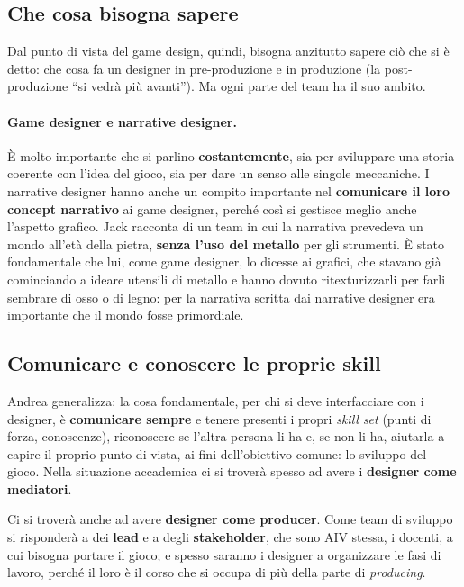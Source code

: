 \subsection{Che cosa bisogna sapere}

Dal punto di vista del game design, quindi, bisogna anzitutto sapere ciò che
si è detto: che cosa fa un designer in pre-produzione e in produzione (la
post-produzione ``si vedrà più avanti''). Ma ogni parte del team ha il suo
ambito.

\paragraph{Game designer e narrative designer.} È molto importante che si
parlino \textbf{costantemente}, sia per sviluppare una storia coerente con
l'idea del gioco, sia per dare un senso alle singole meccaniche. I narrative
designer hanno anche un compito importante nel \textbf{comunicare il loro
concept narrativo} ai game designer, perché così si gestisce meglio anche
l'aspetto grafico. Jack racconta di un team in cui la narrativa prevedeva un
mondo all'età della pietra, \textbf{senza l'uso del metallo} per gli
strumenti. È stato fondamentale che lui, come game designer, lo dicesse ai
grafici, che stavano già cominciando a ideare utensili di metallo e hanno
dovuto ritexturizzarli per farli sembrare di osso o di legno: per la
narrativa scritta dai narrative designer era importante che il mondo fosse
primordiale.

\subsection{Comunicare e conoscere le proprie skill}

Andrea generalizza: la cosa fondamentale, per chi si deve interfacciare con
i designer, è \textbf{comunicare sempre} e tenere presenti i propri
\emph{skill set} (punti di forza, conoscenze), riconoscere se l'altra persona
li ha e, se non li ha, aiutarla a capire il proprio punto di vista, ai fini
dell'obiettivo comune: lo sviluppo del gioco. Nella situazione accademica ci
si troverà spesso ad avere i \textbf{designer come mediatori}.

Ci si troverà anche ad avere \textbf{designer come producer}. Come team di
sviluppo si risponderà a dei \textbf{lead} e a degli \textbf{stakeholder},
che sono AIV stessa, i docenti, a cui bisogna portare il gioco; e spesso
saranno i designer a organizzare le fasi di lavoro, perché il loro è il corso
che si occupa di più della parte di \emph{producing}.

